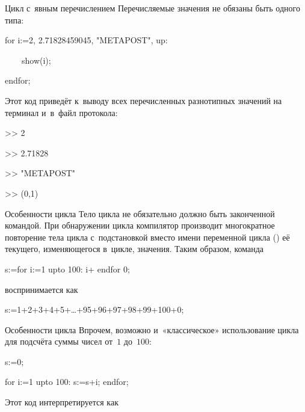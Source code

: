 
\begin{frame}{Цикл  с~явным перечислением}
Перечисляемые значения не обязаны быть одного типа:
\begin{programlisting}
for i:=2, 2.71828459045, "METAPOST", up:\par
~~~~show(i);\par
endfor;
\end{programlisting}

Этот код приведёт к~выводу всех перечисленных разнотипных значений на терминал
и~в~файл протокола:
\begin{screen}%
>> 2\par
>> 2.71828\par
>> "METAPOST"\par
>> (0,1)
\end{screen}
\end{frame}


\begin{frame}{Особенности цикла }
Тело цикла  не обязательно должно быть законченной командой. При
обнаружении цикла  компилятор  производит
многократное повторение тела цикла с~подстановкой вместо имени переменной цикла
() её текущего, изменяющегося в~цикле, значения. Таким образом,
команда
\begin{programlisting}
s:=for i:=1 upto 100: \alert{i+} endfor 0;
\end{programlisting}
воспринимается как
\begin{programlisting}
s:=\alert{1+2+3+4+5+…+95+96+97+98+99+100+}0;
\end{programlisting}
\end{frame}


\begin{frame}{Особенности цикла }
Впрочем, возможно и~«классическое» использование цикла для подсчёта суммы чисел
от~$1$ до~$100$:
\begin{programlisting}%
s:=0;\par
for i:=1 upto 100: \alert{s:=s+i;} endfor;
\end{programlisting}
Этот код интерпретируется как
\end{frame}

